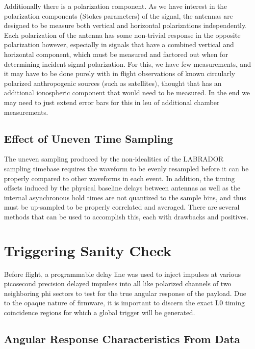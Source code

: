 		Additionally there is a polarization component.  As we have interest in the polarization components (Stokes parameters) of the signal, the antennas are designed to be measure both vertical and horizontal polarizations independently.  Each polarization of the antenna has some non-trivial response in the opposite polarization however, especially in signals that have a combined vertical and horizontal component, which must be measured and factored out when for determining incident signal polarization.  For this, we have few measurements, and it may have to be done purely with in flight observations of known circularly polarized anthropogenic sources (such as satellites), thought that has an additional ionospheric component that would need to be measured.  In the end we may need to just extend error bars for this in leu of additional chamber measurements.
		
	\subsection{Effect of Uneven Time Sampling}
	The uneven sampling produced by the non-idealities of the LABRADOR sampling timebase requires the waveform to be evenly resampled before it can be properly compared to other waveforms in each event.  In addition, the timing offsets induced by the physical baseline delays between antennas as well as the internal asynchronous hold times are not quantized to the sample bins, and thus must be up-sampled to be properly correlated and averaged.  There are several methods that can be used to accomplish this, each with drawbacks and positives.

	

	
	
\section{Triggering Sanity Check}
		Before flight, a programmable delay line was used to inject impulses at various picosecond precision delayed impulses into all like polarized channels of two neighboring phi sectors to test for the true angular response of the payload.  Due to the opaque nature of firmware, it is important to discern the exact L0 timing coincidence regions for which a global trigger will be generated.
	\subsection{Angular Response Characteristics From Data}




